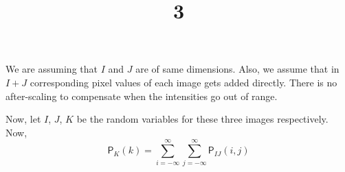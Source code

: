 \documentclass[a4paper]{article}
\title{3}
\date{}
\renewcommand{\P}{\textsf{P}}
\begin{document}
\maketitle
We are assuming that $I$ and $J$ are of same dimensions. Also, we assume that in $I+J$ corresponding pixel values of each image gets added directly. There is no after-scaling to compensate when the intensities go out of range.

Now, let $I$, $J$, $K$ be the random variables for these three images respectively. Now, 
\begin{equation}
	\P_K(k) = \sum_{i=-\infty}^{\infty}\sum_{j=-\infty}^{\infty} \P_{IJ}(i,j)
\end{equation}
\end{document}
